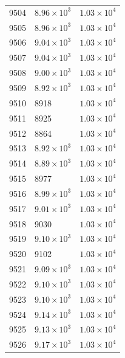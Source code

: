\begin{table}[H]
\begin{tabular}{lll}
9504 & $\displaystyle 8.96 \times 10^{3}$ & $\displaystyle 1.03 \times 10^{4}$ \\
9505 & $\displaystyle 8.96 \times 10^{3}$ & $\displaystyle 1.03 \times 10^{4}$ \\
9506 & $\displaystyle 9.04 \times 10^{3}$ & $\displaystyle 1.03 \times 10^{4}$ \\
9507 & $\displaystyle 9.04 \times 10^{3}$ & $\displaystyle 1.03 \times 10^{4}$ \\
9508 & $\displaystyle 9.00 \times 10^{3}$ & $\displaystyle 1.03 \times 10^{4}$ \\
9509 & $\displaystyle 8.92 \times 10^{3}$ & $\displaystyle 1.03 \times 10^{4}$ \\
9510 & 8918 & $\displaystyle 1.03 \times 10^{4}$ \\
9511 & 8925 & $\displaystyle 1.03 \times 10^{4}$ \\
9512 & 8864 & $\displaystyle 1.03 \times 10^{4}$ \\
9513 & $\displaystyle 8.92 \times 10^{3}$ & $\displaystyle 1.03 \times 10^{4}$ \\
9514 & $\displaystyle 8.89 \times 10^{3}$ & $\displaystyle 1.03 \times 10^{4}$ \\
9515 & 8977 & $\displaystyle 1.03 \times 10^{4}$ \\
9516 & $\displaystyle 8.99 \times 10^{3}$ & $\displaystyle 1.03 \times 10^{4}$ \\
9517 & $\displaystyle 9.01 \times 10^{3}$ & $\displaystyle 1.03 \times 10^{4}$ \\
9518 & 9030 & $\displaystyle 1.03 \times 10^{4}$ \\
9519 & $\displaystyle 9.10 \times 10^{3}$ & $\displaystyle 1.03 \times 10^{4}$ \\
9520 & 9102 & $\displaystyle 1.03 \times 10^{4}$ \\
9521 & $\displaystyle 9.09 \times 10^{3}$ & $\displaystyle 1.03 \times 10^{4}$ \\
9522 & $\displaystyle 9.10 \times 10^{3}$ & $\displaystyle 1.03 \times 10^{4}$ \\
9523 & $\displaystyle 9.10 \times 10^{3}$ & $\displaystyle 1.03 \times 10^{4}$ \\
9524 & $\displaystyle 9.14 \times 10^{3}$ & $\displaystyle 1.03 \times 10^{4}$ \\
9525 & $\displaystyle 9.13 \times 10^{3}$ & $\displaystyle 1.03 \times 10^{4}$ \\
9526 & $\displaystyle 9.17 \times 10^{3}$ & $\displaystyle 1.03 \times 10^{4}$ \\

\end{tabular}
\end{table}
